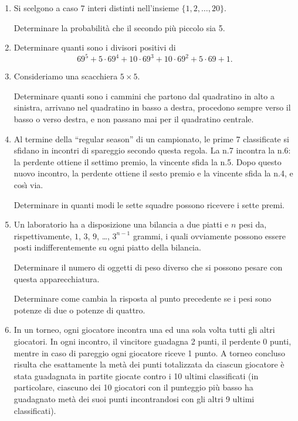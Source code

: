 \documentclass[a4paper,10pt]{article}
\begin{document}
\begin{enumerate}
	\item  Si scelgono a caso 7 interi distinti nell'insieme $\{1,2,\ldots,20\}$.

	Determinare la probabilit\`{a} che il secondo pi\`{u} piccolo sia 5.

	\item  Determinare quanti sono i divisori positivi di $$69^{5}+5\cdot 69^{4}+10\cdot 69^{3}+10\cdot 69^{2}+5\cdot 69+1.$$

	\item  Consideriamo una scacchiera $5\times 5$.

	Determinare quanti sono i cammini che partono dal quadratino in alto a sinistra, arrivano nel quadratino in basso a destra, procedono 	sempre verso il basso o verso destra, e non passano mai per il quadratino centrale.

	\item  Al termine della ``regular season'' di un campionato, le prime 7 classificate si sfidano in incontri di spareggio secondo questa regola. La n.7 incontra la n.6: la perdente ottiene il settimo premio, la vincente sfida la n.5. Dopo questo nuovo incontro, la perdente ottiene il sesto premio e la vincente sfida la n.4, e cos\`{\i} via.

	Determinare in quanti modi le sette squadre possono ricevere i sette premi.

	\item  Un laboratorio ha a disposizione una bilancia a due piatti e $n$ pesi da, rispettivamente, $1$, $3$, $9$, \ldots, $3^{n-1}$ grammi, i quali ovviamente possono essere posti indifferentemente su ogni piatto della bilancia.

	Determinare il numero di oggetti di peso diverso che si possono pesare con questa apparecchiatura.

	Determinare come cambia la risposta al punto precedente se i pesi sono potenze di due o potenze di quattro.

	\item  In un torneo, ogni giocatore incontra una ed una sola volta tutti gli altri giocatori. In ogni incontro, il vincitore guadagna 2 punti, il perdente 0 punti, mentre in caso di pareggio ogni giocatore riceve 1 punto. A torneo concluso risulta che esattamente la met\`{a} dei punti totalizzata da ciascun giocatore \`{e} stata guadagnata in partite giocate contro i 10 ultimi classificati (in particolare, ciascuno dei 10 giocatori con il punteggio pi\`{u} basso ha guadagnato met\`{a} dei suoi punti incontrandosi con gli altri 9 ultimi classificati).


\end{enumerate}
\end{document}
